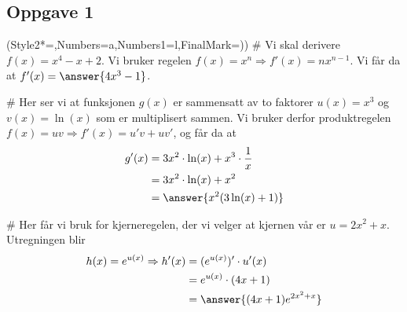 \subsection*{Oppgave 1}
\begin{easylist}[enumerate]
	\ListProperties(Style2*=,Numbers=a,Numbers1=l,FinalMark={)})
	# Vi skal derivere $f(x) = x^4 - x +2$. Vi bruker regelen $f(x) = x^n \Rightarrow f'(x) = nx^{n-1}$. Vi får da at $f'(x) = \answer{4x^3 - 1}$.
	
	# Her ser vi at funksjonen $g(x)$ er sammensatt av to faktorer $u(x) = x^3$ og $v(x) = \ln(x)$ som er multiplisert sammen. 
	Vi bruker derfor produktregelen $f(x) = uv \Rightarrow f'(x) = u'v + uv'$, og får da at
	\begin{align*}
	g'(x) &= 3x^2 \cdot \ln(x) + x^3 \cdot \frac{1}{x}\\
			&= 3x^2 \cdot \ln(x) + x^2\\
			&= \answer{x^2(3\ln(x)+1)}
	\end{align*}
	
	# Her får vi bruk for kjerneregelen, der vi velger at kjernen vår er $u = 2x^2 + x$. 
	Utregningen blir 
	\begin{align*}
	h(x) = e^{u(x)} \Rightarrow h'(x) 
	&= (e^{u(x)})' \cdot u'(x) \\
	&= e^{u(x)} \cdot (4x + 1) \\
	&= \answer{(4x +1)e^{2x^2 + x}}
	\end{align*}
\end{easylist}


